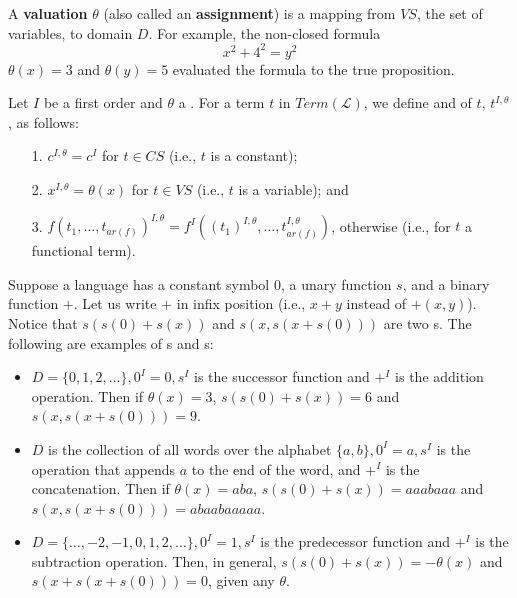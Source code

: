 \documentclass[english, 11pt]{article}
\begin{document}
  \begin{defn}[valuation]\label{valuationfol}
  A \textbf{valuation} $\theta$ (also called an \textbf{assignment}) is a mapping from $VS$, the set of variables, to domain $D$. For example, the non-closed formula
  \[ x^2 + 4^2 = y^2 \]
  $\theta(x) = 3$ and $\theta(y) = 5$ evaluated the formula to the true proposition.
  \end{defn}
  Let $I$ be a first order  and $\theta$ a . For a term $t$ in $Term(\mathcal{L})$, we define  and  of $t$, $t^{I,\theta}$, as follows:
  \begin{itemize}
    \item[1.] $c^{I,\theta} = c^I$ for $t \in CS$ (i.e., $t$ is a constant);
    \item[2.] $x^{I,\theta} = \theta(x)$ for $t \in VS$ (i.e., $t$ is a variable); and
    \item[3.] $f(t_1,\ldots,t_{ar(f)})^{I,\theta} = f^I((t_1)^{I,\theta},\ldots,t_{ar(f)}^{I,\theta})$, otherwise (i.e., for $t$ a functional term).
  \end{itemize}
  \begin{exmp}
    Suppose a language has a constant symbol 0, a unary function $s$, and a binary function $+$. Let us write $+$ in infix position (i.e., $x + y$ instead of $+(x,y)$). Notice that $s(s(0) + s(x))$ and $s(x,s(x+s(0)))$ are two s. The following are examples of s and s:
    \begin{itemize}
      \item $D = \{0,1,2,\ldots\}, 0^I = 0, s^I$ is the successor function and $+^I$ is the addition operation. Then if $\theta(x) = 3$, $s(s(0) + s(x)) = 6$ and $s(x,s(x+s(0))) = 9$.
      \item $D$ is the collection of all words over the alphabet $\{a,b\}, 0^I = a, s^I$ is the operation that appends $a$ to the end of the word, and $+^I$ is the concatenation. Then if $\theta(x) = aba$, $s(s(0) + s(x)) = aaabaaa$ and $s(x,s(x+s(0))) = abaabaaaaa$.
      \item $D = \{\ldots, -2,-1,0,1,2,\ldots\}, 0^I = 1, s^I$ is the predecessor function and $+^I$ is the subtraction operation. Then, in general, $s(s(0) + s(x)) = -\theta(x)$ and $s(x+s(x+s(0))) = 0$, given any  $\theta$.
    \end{itemize}
  \end{exmp}
\end{document}
